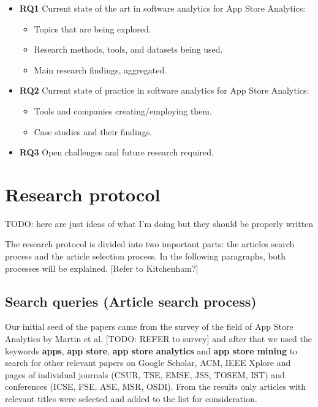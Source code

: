 \documentclass[]{book}
\providecommand{\tightlist}{%
  \setlength{\itemsep}{0pt}\setlength{\parskip}{0pt}}
\begin{document}
\begin{itemize}
\tightlist
\item
  \textbf{RQ1} Current state of the art in software analytics for App
  Store Analytics:

  \begin{itemize}
  \tightlist
  \item
    Topics that are being explored.
  \item
    Research methods, tools, and datasets being used.
  \item
    Main research findings, aggregated.
  \end{itemize}
\item
  \textbf{RQ2} Current state of practice in software analytics for App
  Store Analytics:

  \begin{itemize}
  \tightlist
  \item
    Tools and companies creating/employing them.
  \item
    Case studies and their findings.
  \end{itemize}
\item
  \textbf{RQ3} Open challenges and future research required.
\end{itemize}

\section{Research protocol}\label{research-protocol-5}

TODO: here are just ideas of what I'm doing but they should be properly
written

The research protocol is divided into two important parts: the articles
search process and the article selection process. In the following
paragraphs, both processes will be explained. {[}Refer to Kitchenham?{]}

\subsection{Search queries (Article search
process)}\label{search-queries-article-search-process}

Our initial seed of the papers came from the survey of the field of App
Store Analytics by Martin et al. {[}TODO: REFER to survey{]} and after
that we used the keywords \textbf{apps}, \textbf{app store}, \textbf{app
store analytics} and \textbf{app store mining} to search for other
relevant papers on Google Scholar, ACM, IEEE Xplore and pages of
individual journals (CSUR, TSE, EMSE, JSS, TOSEM, IST) and conferences
(ICSE, FSE, ASE, MSR, OSDI). From the results only articles with
relevant titles were selected and added to the list for consideration.
\end{document}
